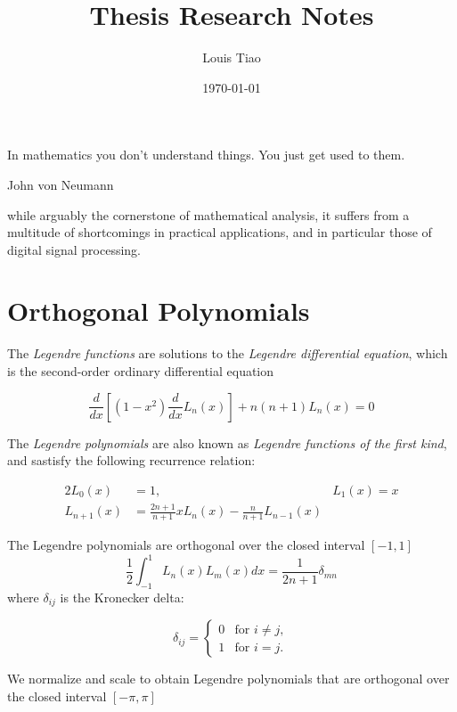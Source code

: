 \documentclass[11pt]{article}
\theoremstyle{plain}
\theoremstyle{definition}
\theoremstyle{remark}
\begin{document}
\title{Thesis Research Notes}
\author{Louis Tiao}
\date{\today}

\maketitle

\epigraph{In mathematics you don't understand things. You just get used to them.}{John von Neumann}

while arguably the cornerstone of mathematical analysis, it suffers from a multitude of shortcomings
in practical applications, and in particular those of digital signal processing.

\section{Orthogonal Polynomials}

The \emph{Legendre functions} are solutions to the \emph{Legendre differential 
equation}, which is the second-order ordinary differential equation

\begin{equation} \label{eq:legendre_de}
\frac{d}{dx}\left[(1-x^2)\frac{d}{dx}L_n(x)\right]+n(n+1)L_n(x)=0
\end{equation}

The \emph{Legendre polynomials} are also known as \emph{Legendre functions of the 
first kind}, and sastisfy the following recurrence relation:

\begin{alignat*}{2}
L_0(x) &= 1, & L_1(x) = x \\
L_{n+1}(x) &= \frac{2n+1}{n+1} x L_n(x) - \frac{n}{n+1} L_{n-1}(x)
\end{alignat*}

The Legendre polynomials are orthogonal over the closed interval 
$[-1, 1]$
\begin{equation*}
	\frac{1}{2}\int_{-1}^{1} L_n(x)L_m(x) dx = \frac{1}{2n+1} \delta_{mn}
\end{equation*}
where $\delta_{ij}$ is the Kronecker delta:

\begin{equation*}
	\delta_{ij} =
	  \begin{cases}
	   0 			 & \text{for } i \neq j, \\
	   1       & \text{for } i = j.
	  \end{cases}
\end{equation*}

We normalize and scale to obtain Legendre polynomials that are
orthogonal over the closed interval $[-\pi,\pi]$
\end{document}
